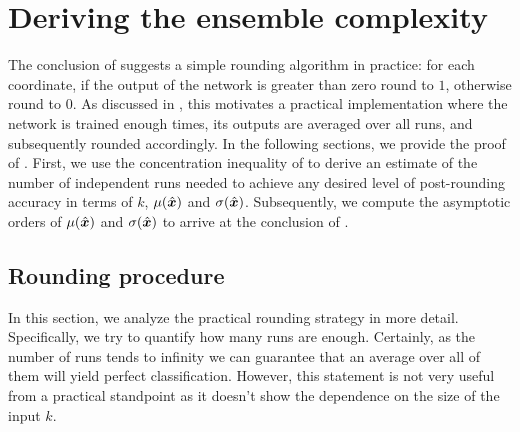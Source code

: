 \section{Deriving the ensemble complexity}
\label{sec:behavior}
The conclusion of  suggests a simple rounding algorithm in practice: for each coordinate, if the output of the network is greater than zero round to $1$, otherwise round to $0$. As discussed in , this motivates a practical implementation where the network is trained enough times, its outputs are averaged over all runs, and subsequently rounded accordingly. In the following sections, we provide the proof of . First, we use the concentration inequality of   to derive an estimate of the number of independent runs needed to achieve any desired level of post-rounding accuracy in terms of $k$, $\mu(\hat{\boldsymbol{x}})$ and $\sigma(\hat{\boldsymbol{x}})$. Subsequently, we compute the asymptotic orders of $\mu(\hat{\boldsymbol{x}})$ and $\sigma(\hat{\boldsymbol{x}})$ to arrive at the conclusion of .

\subsection{Rounding procedure}
In this section, we analyze the practical rounding strategy in more detail. Specifically, we try to quantify how many runs are enough. Certainly, as the number of runs tends to infinity we can guarantee that an average over all of them will yield perfect classification. However, this statement is not very useful from a practical standpoint as it doesn't show the dependence on the size of the input $k$.
